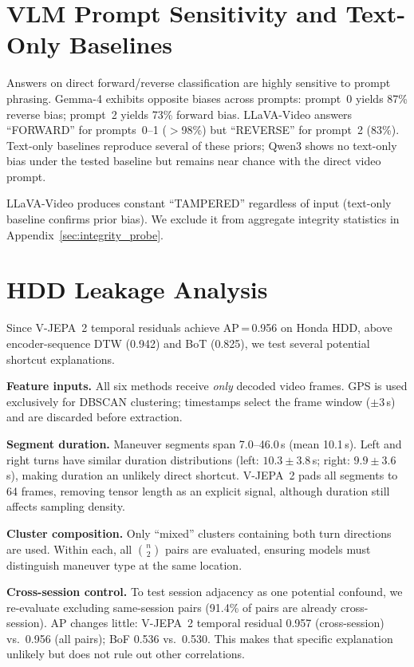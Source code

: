 \documentclass{article}
\theoremstyle{remark}
\begin{document}
\section{VLM Prompt Sensitivity and Text-Only Baselines}
\label{sec:prompt_details}

Answers on direct forward/reverse classification are highly sensitive to prompt phrasing. Gemma-4 exhibits opposite biases across prompts: prompt~0 yields 87\% reverse bias; prompt~2 yields 73\% forward bias. LLaVA-Video answers ``FORWARD'' for prompts~0--1 ($>$98\%) but ``REVERSE'' for prompt~2 (83\%). Text-only baselines reproduce several of these priors; Qwen3 shows no text-only bias under the tested baseline but remains near chance with the direct video prompt.

LLaVA-Video produces constant ``TAMPERED'' regardless of input (text-only baseline confirms prior bias). We exclude it from aggregate integrity statistics in Appendix~\ref{sec:integrity_probe}.

\section{HDD Leakage Analysis}
\label{sec:hdd_leakage}

Since V-JEPA~2 temporal residuals achieve AP\,=\,0.956 on Honda HDD, above encoder-sequence DTW (0.942) and BoT (0.825), we test several potential shortcut explanations.

\textbf{Feature inputs.} All six methods receive \emph{only} decoded video frames. GPS is used exclusively for DBSCAN clustering; timestamps select the frame window ($\pm$3\,s) and are discarded before extraction.

\textbf{Segment duration.} Maneuver segments span 7.0--46.0\,s (mean 10.1\,s). Left and right turns have similar duration distributions (left: $10.3 \pm 3.8$\,s; right: $9.9 \pm 3.6$\,s), making duration an unlikely direct shortcut. V-JEPA~2 pads all segments to 64 frames, removing tensor length as an explicit signal, although duration still affects sampling density.

\textbf{Cluster composition.} Only ``mixed'' clusters containing both turn directions are used. Within each, all $\binom{n}{2}$ pairs are evaluated, ensuring models must distinguish maneuver type at the same location.

\textbf{Cross-session control.} To test session adjacency as one potential confound, we re-evaluate excluding same-session pairs (91.4\% of pairs are already cross-session). AP changes little: V-JEPA~2 temporal residual 0.957 (cross-session) vs.\ 0.956 (all pairs); BoF 0.536 vs.\ 0.530. This makes that specific explanation unlikely but does not rule out other correlations.
\end{document}
